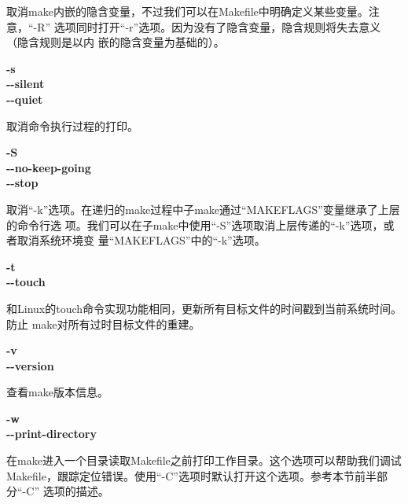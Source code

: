 \begin{dinglist}{47}
取消make内嵌的隐含变量，不过我们可以在Makefile中明确定义某些变量。注意，“-R”
选项同时打开“-r”选项。因为没有了隐含变量，隐含规则将失去意义（隐含规则是以内
嵌的隐含变量为基础的）。

  \item \begin{minipage}[t]{\linewidth}
          \textbf{-s} \\
          \textbf{-{}-silent}\\
            \textbf{-{}-quiet}
        \end{minipage}

取消命令执行过程的打印。

  \item \begin{minipage}[t]{\linewidth}
          \textbf{-S} \\
          \textbf{-{}-no-keep-going}\\
            \textbf{-{}-stop}
        \end{minipage}

取消“-k”选项。在递归的make过程中子make通过“MAKEFLAGS”变量继承了上层的命令行选
项。我们可以在子make中使用“-S”选项取消上层传递的“-k”选项，或者取消系统环境变
量“MAKEFLAGS”中的“-k”选项。

  \item \begin{minipage}[t]{\linewidth}
          \textbf{-t} \\
          \textbf{-{}-touch}
        \end{minipage}

和Linux的touch命令实现功能相同，更新所有目标文件的时间戳到当前系统时间。防止
make对所有过时目标文件的重建。

  \item \begin{minipage}[t]{\linewidth}
          \textbf{-v} \\
          \textbf{-{}-version}
        \end{minipage}

查看make版本信息。

  \item \begin{minipage}[t]{\linewidth}
          \textbf{-w} \\
          \textbf{-{}-print-directory}
        \end{minipage}

在make进入一个目录读取Makefile之前打印工作目录。这个选项可以帮助我们调试
Makefile，跟踪定位错误。使用“-C”选项时默认打开这个选项。参考本节前半部分“-C”
选项的描述。


\end{dinglist}
